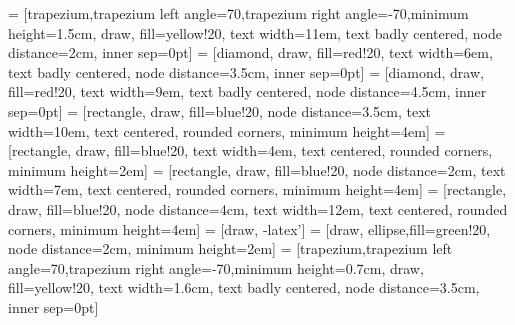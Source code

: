  = [trapezium,trapezium left angle=70,trapezium right angle=-70,minimum height=1.5cm, draw, fill=yellow!20, text width=11em, text badly centered, node distance=2cm, inner sep=0pt]
 = [diamond, draw, fill=red!20, 
    text width=6em, text badly centered, node distance=3.5cm, inner sep=0pt]
 = [diamond, draw, fill=red!20, 
    text width=9em, text badly centered, node distance=4.5cm, inner sep=0pt]
 = [rectangle, draw, fill=blue!20, node distance=3.5cm,
    text width=10em, text centered, rounded corners, minimum height=4em]
     = [rectangle, draw, fill=blue!20, 
    text width=4em, text centered, rounded corners, minimum height=2em]
     = [rectangle, draw, fill=blue!20, node distance=2cm,
    text width=7em, text centered, rounded corners, minimum height=4em]
     = [rectangle, draw, fill=blue!20, node distance=4cm,
    text width=12em, text centered, rounded corners, minimum height=4em]
     = [draw, -latex']
 = [draw, ellipse,fill=green!20, node distance=2cm,
    minimum height=2em]
     = [trapezium,trapezium left angle=70,trapezium right angle=-70,minimum height=0.7cm, draw, fill=yellow!20, text width=1.6cm, text badly centered, node distance=3.5cm, inner sep=0pt]
    
